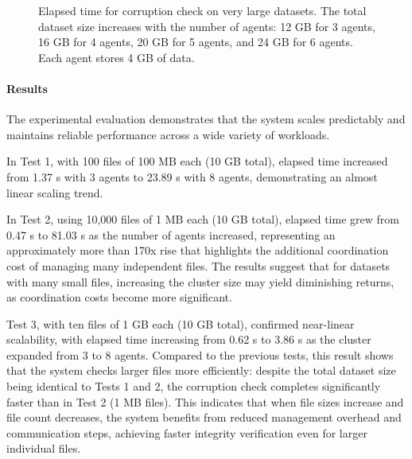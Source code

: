\begin{figure}[!ht]
\centering
{}
\caption{Elapsed time for corruption check on very large datasets. The total dataset size increases
    with the number of agents: 12 GB for 3 agents, 16 GB for 4 agents, 20 GB
    for 5 agents, and 24 GB for 6 agents. Each agent stores 4 GB of data.}
\label{fig:test-4}
\end{figure}

\newpage

\paragraph{Results}

The experimental evaluation demonstrates that the system scales predictably and
maintains reliable performance across a wide variety of workloads.

In Test 1, with 100 files of 100 MB each (10 GB total), elapsed time increased from 1.37 s
with 3 agents to 23.89 s with 8 agents, demonstrating an almost linear scaling trend.

In Test 2, using 10,000 files of 1 MB each (10 GB total), elapsed time grew from 0.47 s to
81.03 s as the number of agents increased, representing an approximately more
than 170x rise that highlights the additional coordination cost of managing many independent files.
 The results suggest that for datasets with many small files, increasing the cluster size may yield diminishing returns, as coordination costs become more significant.


Test 3, with ten files of 1 GB each (10 GB total), confirmed near-linear scalability, with elapsed time increasing from 0.62 s to 3.86 s as the cluster expanded from 3 to 8 agents.
Compared to the previous tests, this result shows that the system checks larger files more efficiently: despite the total dataset size being identical to Tests 1 and 2, the corruption check completes significantly faster than in Test 2 (1 MB files). This indicates that when file sizes increase and file count decreases, the system benefits from reduced management overhead and communication steps, achieving faster integrity verification even for larger individual files.

